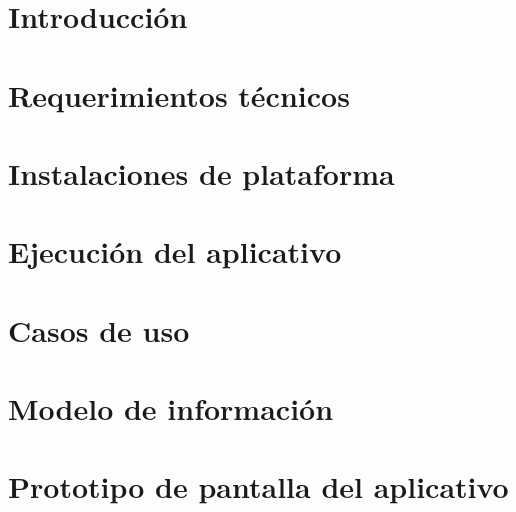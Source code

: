 



	\begin{titlepage}
		
	\end{titlepage}
	
	\tableofcontents
	\newpage
	
    \section{Introducción}
        
		\newpage
       	
    \section{Requerimientos técnicos}
        
        \newpage
        
    \section{Instalaciones de plataforma}
        
		\newpage        
        
    \section{Ejecución del aplicativo}
        
        \newpage
        
    \section{Casos de uso}
        
        \newpage
        
    \section{Modelo de información}
        
        \newpage
        
   	\section{Prototipo de pantalla del aplicativo}
        
        \newpage


